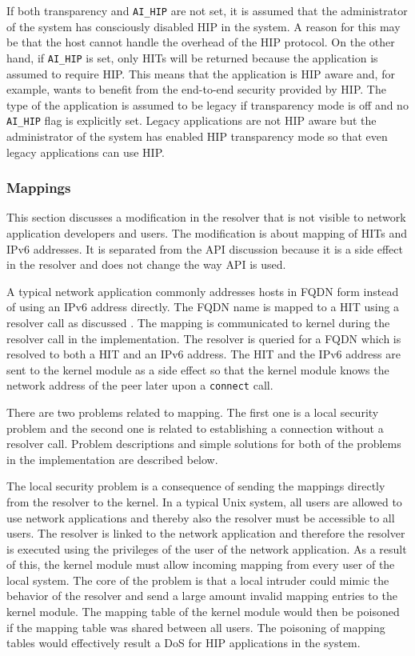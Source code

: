 If both transparency and \verb|AI_HIP| are not set, it is assumed that
the administrator of the system has consciously disabled \ac{HIP} in
the system. A reason for this may be that the host cannot handle the
overhead of the \ac{HIP} protocol. On the other hand, if \verb|AI_HIP|
is set, only \acp{HIT} will be returned because the application is
assumed to require \ac{HIP}. This means that the application is
\ac{HIP} aware and, for example, wants to benefit from the end-to-end
security provided by \ac{HIP}. The type of the application is assumed
to be legacy if transparency mode is off and no \verb|AI_HIP| flag is
explicitly set. Legacy applications are not \ac{HIP} aware but the
administrator of the system has enabled \ac{HIP} transparency mode so
that even legacy applications can use \ac{HIP}.

\subsubsection{Mappings}
\label{sec:mapping_architecture}

This section discusses a modification in the resolver that is not
visible to network application developers and users. The modification
is about mapping of \acp{HIT} and IPv6 addresses. It is separated from
the \ac{API} discussion  because
it is a side effect in the resolver and does not change the way
\ac{API} is used.

A typical network application commonly addresses hosts in \ac{FQDN}
form instead of using an IPv6 address directly. The \ac{FQDN} name is
mapped to a \ac{HIT} using a resolver call as discussed
. The mapping is communicated to
kernel during the resolver call in the implementation. The resolver is
queried for a \ac{FQDN} which is resolved to both a \ac{HIT} and an
IPv6 address. The \ac{HIT} and the IPv6 address are sent to the kernel
module as a side effect so that the kernel module knows the network
address of the peer later upon a \verb|connect| call.

There are two problems related to mapping. The first one is a local
security problem and the second one is related to establishing a
connection without a resolver call. Problem descriptions and simple
solutions for both of the problems in the implementation are described
below.

The local security problem is a consequence of sending the mappings
directly from the resolver to the kernel. In a typical Unix system,
all users are allowed to use network applications and thereby also the
resolver must be accessible to all users. The resolver is linked to
the network application and therefore the resolver is executed using
the privileges of the user of the network application. As a result of
this, the kernel module must allow incoming mapping from every user of
the local system. The core of the problem is that a local intruder
could mimic the behavior of the resolver and send a large amount
invalid mapping entries to the kernel module. The mapping table of the
kernel module would then be poisoned if the mapping table was shared
between all users. The poisoning of mapping tables would effectively
result a \ac{DoS} for \ac{HIP} applications in the system.


